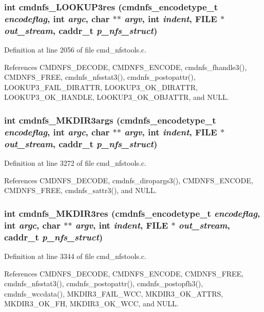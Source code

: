 \subsubsection{\setlength{\rightskip}{0pt plus 5cm}int cmdnfs\_\-LOOKUP3res ({\bf cmdnfs\_\-encodetype\_\-t} {\em encodeflag}, int {\em argc}, char $\ast$$\ast$ {\em argv}, int {\em indent}, FILE $\ast$ {\em out\_\-stream}, caddr\_\-t {\em p\_\-nfs\_\-struct})}\label{cmd__nfstools_8c_a88}




Definition at line 2056 of file cmd\_\-nfstools.c.

References CMDNFS\_\-DECODE, CMDNFS\_\-ENCODE, cmdnfs\_\-fhandle3(), CMDNFS\_\-FREE, cmdnfs\_\-nfsstat3(), cmdnfs\_\-postopattr(), LOOKUP3\_\-FAIL\_\-DIRATTR, LOOKUP3\_\-OK\_\-DIRATTR, LOOKUP3\_\-OK\_\-HANDLE, LOOKUP3\_\-OK\_\-OBJATTR, and NULL.
\subsubsection{\setlength{\rightskip}{0pt plus 5cm}int cmdnfs\_\-MKDIR3args ({\bf cmdnfs\_\-encodetype\_\-t} {\em encodeflag}, int {\em argc}, char $\ast$$\ast$ {\em argv}, int {\em indent}, FILE $\ast$ {\em out\_\-stream}, caddr\_\-t {\em p\_\-nfs\_\-struct})}\label{cmd__nfstools_8c_a104}




Definition at line 3272 of file cmd\_\-nfstools.c.

References CMDNFS\_\-DECODE, cmdnfs\_\-diropargs3(), CMDNFS\_\-ENCODE, CMDNFS\_\-FREE, cmdnfs\_\-sattr3(), and NULL.
\subsubsection{\setlength{\rightskip}{0pt plus 5cm}int cmdnfs\_\-MKDIR3res ({\bf cmdnfs\_\-encodetype\_\-t} {\em encodeflag}, int {\em argc}, char $\ast$$\ast$ {\em argv}, int {\em indent}, FILE $\ast$ {\em out\_\-stream}, caddr\_\-t {\em p\_\-nfs\_\-struct})}\label{cmd__nfstools_8c_a105}




Definition at line 3344 of file cmd\_\-nfstools.c.

References CMDNFS\_\-DECODE, CMDNFS\_\-ENCODE, CMDNFS\_\-FREE, cmdnfs\_\-nfsstat3(), cmdnfs\_\-postopattr(), cmdnfs\_\-postopfh3(), cmdnfs\_\-wccdata(), MKDIR3\_\-FAIL\_\-WCC, MKDIR3\_\-OK\_\-ATTRS, MKDIR3\_\-OK\_\-FH, MKDIR3\_\-OK\_\-WCC, and NULL.
